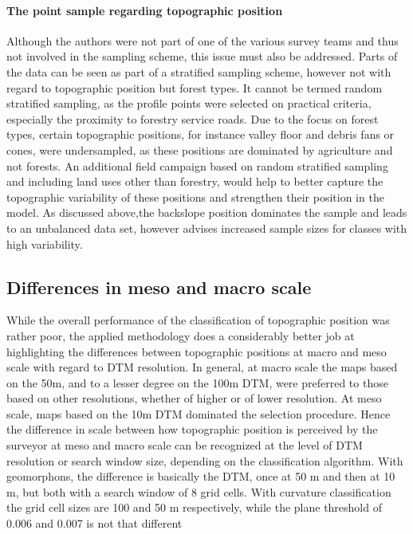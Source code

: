 \documentclass[final,1p,times,twocolumn,authoryear]{elsarticle}
\begin{document}
\paragraph{The point sample regarding topographic position}
Although the authors were not part of one of the various survey teams and thus not involved in the sampling scheme, this issue must also be addressed. Parts of the data can be seen as part of a stratified sampling scheme, however not with regard to topographic position but forest types. It cannot be termed random stratified sampling, as the profile points were selected on practical criteria, especially the proximity to forestry service roads. Due to the focus on forest types, certain topographic positions, for instance valley floor and debris fans or cones, were undersampled, as these positions are dominated by agriculture and not forests. An additional field campaign based on random stratified sampling and including land uses other than forestry, would help to better capture the topographic variability of these positions and strengthen their position in the model. As discussed above,the backslope position dominates the sample and leads to an unbalanced data set, however \cite{Congalton1991} advises increased sample sizes for classes with high variability.


\subsection{Differences in meso and macro scale}
While the overall performance of the classification of topographic position was rather poor, the applied methodology does a considerably better job at highlighting the differences between topographic positions at macro and meso scale with regard to DTM resolution.
In general, at macro scale the maps based on the 50m, and to a lesser degree on the 100m DTM, were preferred to those based on other resolutions, whether of higher or of lower resolution. At meso scale, maps based on the 10m DTM dominated the selection procedure. Hence the difference in scale between how topographic position is perceived by the surveyor at meso and macro scale can be recognized at the level of DTM resolution or search window size, depending on the classification algorithm.
With geomorphons, the difference is basically the DTM, once at 50 m and then at 10 m, but both with a search window of 8 grid cells. With curvature classification the grid cell sizes are 100 and 50 m respectively, while the plane threshold of 0.006 and 0.007 is not that different
\end{document}

